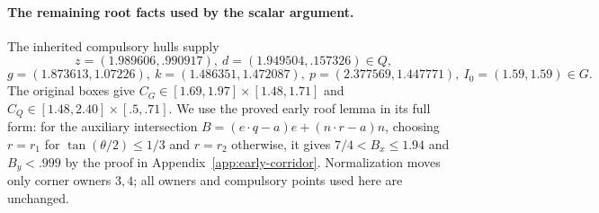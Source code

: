 \documentclass[11pt]{article}
\begin{document}
\paragraph{The remaining root facts used by the scalar argument.}
The inherited compulsory hulls supply
\[
 z=(1.989606,.990917),\ d=(1.949504,.157326)\in Q,
\]
\[
 g=(1.873613,1.07226),\ k=(1.486351,1.472087),
 \ p=(2.377569,1.447771),\ I_0=(1.59,1.59)\in G.
\]
The original boxes give
$C_G\in[1.69,1.97]\times[1.48,1.71]$ and
$C_Q\in[1.48,2.40]\times[.5,.71]$.
We use the proved early roof lemma in its full form: for the auxiliary
intersection $B=(e\cdot q-a)e+(n\cdot r-a)n$, choosing $r=r_1$ for
$\tan(\theta/2)\le1/3$ and $r=r_2$ otherwise, it gives
$7/4<B_x\le1.94$ and $B_y<.999$ by the proof in
Appendix~\ref{app:early-corridor}. Normalization moves only corner owners $3,4$;
all owners and compulsory points used here are unchanged.
\end{document}
